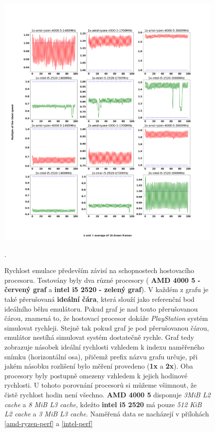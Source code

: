 \begin{figure}[hbt]
    \centering
    \includegraphics[width=1.0\textwidth]{obrazky-figures/cpu-performance.png}
    \caption[Performanční graf]{Rychlost emulace především závisí na schopnostech hostovacího procesoru. Testovány byly dva různé procesory (
    \textbf{\color{red}AMD 4000 5 - červený graf} a \textbf{\color{green}intel i5 2520 - zelený graf}). V každém z grafu
    je také přerušovaná \textbf{\color{blue}ideální čára}, která slouží jako referenční bod ideálního běhu emulátoru.
    Pokud graf je nad touto přerušovanou čárou, znamená to, že hostovací procesor dokáže \textit{PlayStation} systém simulovat rychleji.
    Stejně tak pokud graf je pod přerušovanou čárou, emulátor nestíhá simulovat systém dostatečně rychle.
    Graf tedy zobrazuje násobek ideální rychlosti vzhledem k indexu naměřeného snímku (horizontální osa), přičemž prefix názvu grafu určuje, při jakém násobku rozlišení bylo měření provedeno (\textbf{1x} a \textbf{2x}).
    Oba procesory byly postupně omezeny vzhledem k jejich hodinové rychlosti. U tohoto porovnání procesorů si můžeme všimnout, že čistě rychlost hodin není všechno. \textbf{\color{red}AMD 4000 5} disponuje \textit{3MiB L2 cache} a \textit{8 MiB L3 cache}, kdežto \textbf{\color{green}intel i5 2520} má pouze \textit{512 KiB L2 cache} a \textit{3 MiB L3 cache}. Naměřená data se nacházejí v přílohách \ref{amd-ryzen-perf} a \ref{intel-perf}}.
    \label{cpu-performance}
\end{figure}


